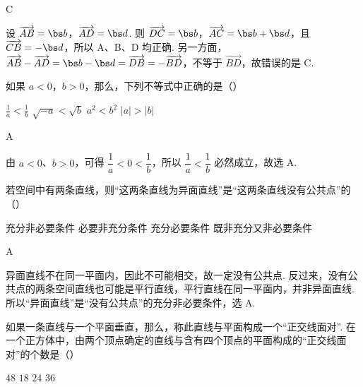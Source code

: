 \begin{answer}
C
\end{answer}

\begin{solution}
设 \(\overrightarrow{AB}=\bs b\)，\(\overrightarrow{AD}=\bs d\). 则 \(\overrightarrow{DC}=\bs b\)，\(\overrightarrow{AC}=\bs b+\bs d\)，且 \(\overrightarrow{CB}=-\bs d\)，所以 A、B、D 均正确. 另一方面，\(\overrightarrow{AB}-\overrightarrow{AD}=\bs b-\bs d=\overrightarrow{DB}=-\overrightarrow{BD}\)，不等于 \(\overrightarrow{BD}\)，故错误的是 C.
\end{solution}

\begin{problem}
如果 \(a < 0\)，\(b > 0\)，那么，下列不等式中正确的是（\quad）

\choices
    {\(\frac{1}{a} < \frac{1}{b}\)}
    {\(\sqrt{-a} < \sqrt{b}\)}
    {\(a^2 < b^2\)}
    {\(|a| > |b|\)}
\end{problem}

\begin{answer}
A
\end{answer}

\begin{solution}
由 \(a<0\)、\(b>0\)，可得 \(\dfrac{1}{a}<0<\dfrac{1}{b}\)，所以 \(\dfrac{1}{a}<\dfrac{1}{b}\) 必然成立，故选 A.
\end{solution}

\begin{problem}
若空间中有两条直线，则“这两条直线为异面直线”是“这两条直线没有公共点”的（\quad）

\choices
    {充分非必要条件}
    {必要非充分条件}
    {充分必要条件}
    {既非充分又非必要条件}
\end{problem}

\begin{answer}
A
\end{answer}

\begin{solution}
异面直线不在同一平面内，因此不可能相交，故一定没有公共点. 反过来，没有公共点的两条空间直线也可能是平行直线，平行直线在同一平面内，并非异面直线. 所以“异面直线”是“没有公共点”的充分非必要条件，选 A.
\end{solution}

\begin{problem}
如果一条直线与一个平面垂直，那么，称此直线与平面构成一个“正交线面对”. 在一个正方体中，由两个顶点确定的直线与含有四个顶点的平面构成的“正交线面对”的个数是（\quad）

\choices
    {\(48\)}
    {\(18\)}
    {\(24\)}
    {\(36\)}
\end{problem}

